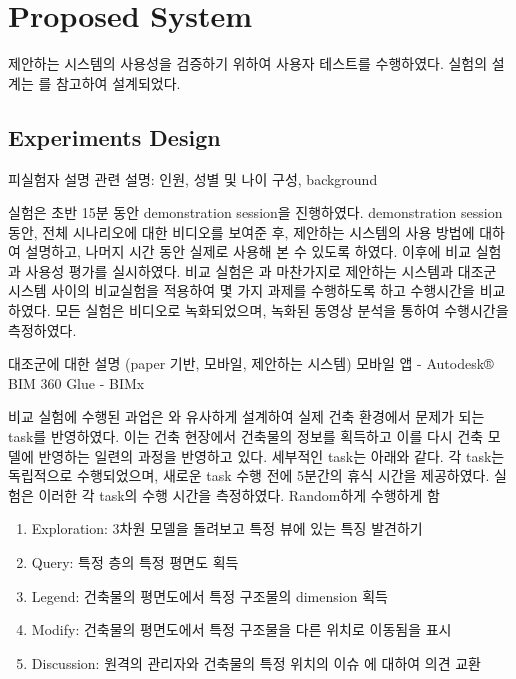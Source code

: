 
\section{Proposed System}

제안하는 시스템의 사용성을 검증하기 위하여 사용자 테스트를 수행하였다. 실험의 설계는 \cite{yeh_-site_2012,lin_using_2014}를 참고하여 설계되었다.

\subsection{Experiments Design}


피실험자 설명 관련 설명: 인원, 성별 및 나이 구성, background

실험은 초반 15분 동안 demonstration session을 진행하였다. demonstration session 동안, 전체 시나리오에 대한 비디오를 보여준 후, 제안하는 시스템의 사용 방법에 대하여 설명하고, 나머지 시간 동안 실제로 사용해 본 수 있도록 하였다. 이후에 비교 실험과 사용성 평가를 실시하였다. 비교 실험은 \cite{yeh_-site_2012}과 마찬가지로 제안하는 시스템과 대조군 시스템 사이의 비교실험을 적용하여 몇 가지 과제를 수행하도록 하고 수행시간을 비교하였다. 모든 실험은 비디오로 녹화되었으며, 녹화된 동영상 분석을 통하여 수행시간을 측정하였다. 

대조군에 대한 설명 (paper 기반, 모바일, 제안하는 시스템)
모바일 앱
 - Autodesk® BIM 360 Glue
 - BIMx 

비교 실험에 수행된 과업은 \cite{yeh_-site_2012}와 유사하게 설계하여 실제 건축 환경에서 문제가 되는 task를 반영하였다. 이는 건축 현장에서 건축물의 정보를 획득하고 이를 다시 건축 모델에 반영하는 일련의 과정을 반영하고 있다. 세부적인 task는 아래와 같다. 각 task는 독립적으로 수행되었으며, 새로운 task 수행 전에 5분간의 휴식 시간을 제공하였다. 실험은 이러한 각 task의 수행 시간을 측정하였다. 
Random하게 수행하게 함

\begin{enumerate}
\item Exploration: 3차원 모델을 돌려보고 특정 뷰에 있는 특징 발견하기
\item Query: 특정 층의 특정 평면도 획득
\item Legend: 건축물의 평면도에서 특정 구조물의 dimension 획득
\item Modify: 건축물의 평면도에서 특정 구조물을 다른 위치로 이동됨을 표시
\item Discussion: 원격의 관리자와 건축물의 특정 위치의 이슈 에 대하여 의견 교환
\end{enumerate}

